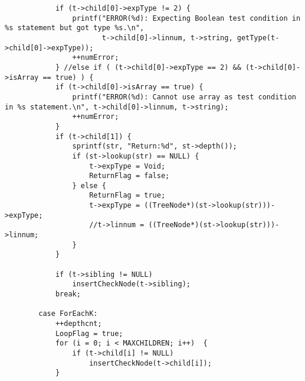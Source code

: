 \documentclass[12pt]{book}
\begin{document}
\begin{lstlisting}
            if (t->child[0]->expType != 2) {
                printf("ERROR(%d): Expecting Boolean test condition in %s statement but got type %s.\n", 
                       t->child[0]->linnum, t->string, getType(t->child[0]->expType));
                ++numError;
            } //else if ( (t->child[0]->expType == 2) && (t->child[0]->isArray == true) ) {
            if (t->child[0]->isArray == true) {
                printf("ERROR(%d): Cannot use array as test condition in %s statement.\n", t->child[0]->linnum, t->string);
                ++numError;
            } 
            if (t->child[1]) {
                sprintf(str, "Return:%d", st->depth());
                if (st->lookup(str) == NULL) {
                    t->expType = Void;
                    ReturnFlag = false;
                } else {
                    ReturnFlag = true;
                    t->expType = ((TreeNode*)(st->lookup(str)))->expType;
                    //t->linnum = ((TreeNode*)(st->lookup(str)))->linnum;
                }
            }

            if (t->sibling != NULL)
                insertCheckNode(t->sibling);
            break;
  
        case ForEachK:
            ++depthcnt;
            LoopFlag = true;
            for (i = 0; i < MAXCHILDREN; i++)  {
                if (t->child[i] != NULL)
                    insertCheckNode(t->child[i]);
            }


\end{lstlisting}
\end{document}
